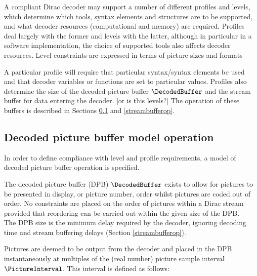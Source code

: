 \label{profilelevel}

A compliant Dirac decoder may support a number of different profiles and levels, which determine 
which tools, syntax elements and structures are to be supported, and what decoder resources 
(computational and memory) are required. Profiles deal largely with the former and levels
with the latter, although in particular in a software implementation, the choice of supported tools
also affects decoder resources. Level constraints are expressed in terms of picture sizes and 
formats 

A particular profile will require that particular syntax/syntax elements be used and that decoder
variables or functions are set to particular values. Profiles also determine the size of the
decoded picture buffer $\DecodedBuffer$ and the stream buffer for data entering the decoder. [or is this levels?]
The operation of these buffers is described in Sections \ref{decodedbufferop} and \ref{streambufferop}.

\begin{comment}
Main=0, $is\_low\_delay()==false$, $using\_ac()==\true$, $using\_mc()==\true$
Simple=1, $is\_low\_delay()==false$, $using\_ac()==\false$, $using\_mc()==\false$
Link=2, $is\_low\_delay()==true$, $using\_ac()==\false$, $using\_mc()==\false$
Wireless=3, $is\_low\_delay()==true$, $using\_ac()==\true$, $using\_mc()==\true$

If we have Simple or Link then $using\_ac()$ is false and $using\_inter()$ is false.
\end{comment}

\subsection{Decoded picture buffer model operation}
\label{decodedbufferop}

In order to define compliance with level and profile requirements, a model of decoded picture buffer
operation is specified.

The decoded picture buffer (DPB) $\DecodedBuffer$ exists to allow for pictures to be presented in display, or 
picture number, order whilst pictures are coded out of order. No constraints are placed on the order
of pictures within a Dirac stream provided that reordering can be carried out within the given size of
the DPB. The DPB size is the minimum delay required by the decoder, ignoring decoding time and stream
buffering delays (Section \ref{streambufferop}).

Pictures are deemed to be output from the decoder and placed in the DPB instantaneously at multiples
of the (real number) picture sample interval $\PictureInterval$. This interval is defined as follows:


